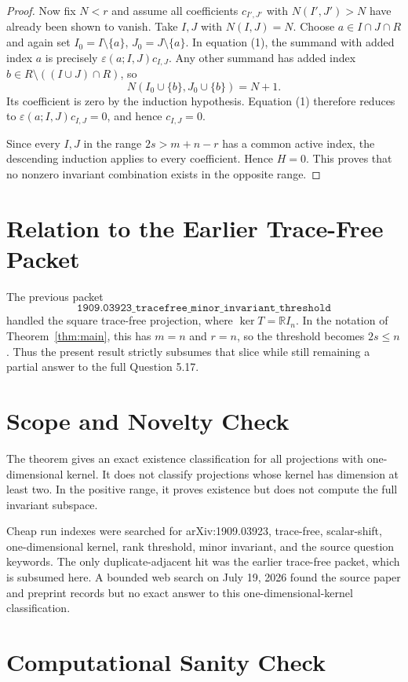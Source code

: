 \documentclass[11pt]{article}
\newcommand{\R}{\mathbb R}
\begin{document}
\begin{proof}
Now fix $N<r$ and assume all coefficients $c_{I',J'}$ with
$N(I',J')>N$ have already been shown to vanish. Take $I,J$ with
$N(I,J)=N$. Choose $a\in I\cap J\cap R$ and again set
$I_0=I\setminus\{a\}$, $J_0=J\setminus\{a\}$. In equation (1), the summand
with added index $a$ is precisely $\varepsilon(a;I,J)c_{I,J}$. Any other
summand has added index $b\in R\setminus((I\cup J)\cap R)$, so
\[
  N(I_0\cup\{b\},J_0\cup\{b\})=N+1.
\]
Its coefficient is zero by the induction hypothesis. Equation (1) therefore
reduces to $\varepsilon(a;I,J)c_{I,J}=0$, and hence $c_{I,J}=0$.

Since every $I,J$ in the range $2s>m+n-r$ has a common active index, the
descending induction applies to every coefficient. Hence $H=0$. This proves
that no nonzero invariant combination exists in the opposite range.
\end{proof}

\section*{Relation to the Earlier Trace-Free Packet}

The previous packet
\[
\texttt{1909.03923\_tracefree\_minor\_invariant\_threshold}
\]
handled the square trace-free projection, where $\ker T=\R I_n$. In the
notation of Theorem~\ref{thm:main}, this has $m=n$ and $r=n$, so the threshold
becomes $2s\le n$. Thus the present result strictly subsumes that slice while
still remaining a partial answer to the full Question 5.17.

\section*{Scope and Novelty Check}

The theorem gives an exact existence classification for all projections with
one-dimensional kernel. It does not classify projections whose kernel has
dimension at least two. In the positive range, it proves existence but does not
compute the full invariant subspace.

Cheap run indexes were searched for arXiv:1909.03923, trace-free,
scalar-shift, one-dimensional kernel, rank threshold, minor invariant, and the
source question keywords. The only duplicate-adjacent hit was the earlier
trace-free packet, which is subsumed here. A bounded web search on
July 19, 2026 found the source paper and preprint records but no exact answer
to this one-dimensional-kernel classification.

\section*{Computational Sanity Check}
\end{document}
